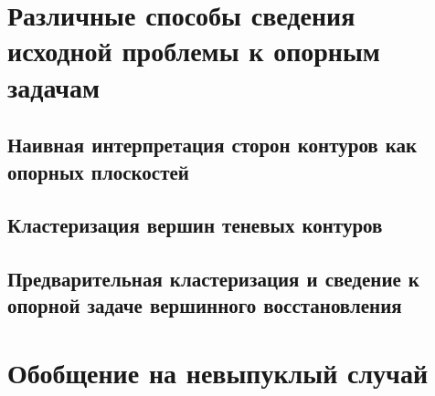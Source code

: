 \documentclass[a4paper, 12pt, titlepage]{article}
\theoremstyle{definition}
\theoremstyle{plain}
\theoremstyle{plain}
\begin{document}

\section{Различные способы сведения исходной проблемы к опорным задачам}

\subsection{Наивная интерпретация сторон контуров как опорных плоскостей}

\subsection{Кластеризация вершин теневых контуров}

\subsection{Предварительная кластеризация и сведение к опорной задаче
вершинного восстановления}




\section{Обобщение на невыпуклый случай}

\newpage


\end{document}
